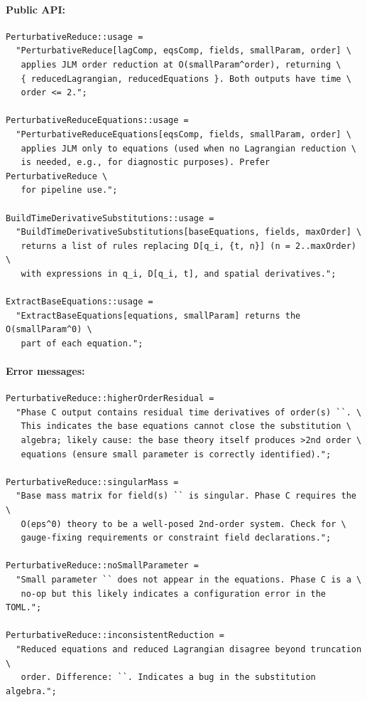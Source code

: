 \paragraph{Public API:}
\begin{verbatim}
PerturbativeReduce::usage =
  "PerturbativeReduce[lagComp, eqsComp, fields, smallParam, order] \
   applies JLM order reduction at O(smallParam^order), returning \
   { reducedLagrangian, reducedEquations }. Both outputs have time \
   order <= 2.";

PerturbativeReduceEquations::usage =
  "PerturbativeReduceEquations[eqsComp, fields, smallParam, order] \
   applies JLM only to equations (used when no Lagrangian reduction \
   is needed, e.g., for diagnostic purposes). Prefer PerturbativeReduce \
   for pipeline use.";

BuildTimeDerivativeSubstitutions::usage =
  "BuildTimeDerivativeSubstitutions[baseEquations, fields, maxOrder] \
   returns a list of rules replacing D[q_i, {t, n}] (n = 2..maxOrder) \
   with expressions in q_i, D[q_i, t], and spatial derivatives.";

ExtractBaseEquations::usage =
  "ExtractBaseEquations[equations, smallParam] returns the O(smallParam^0) \
   part of each equation.";
\end{verbatim}

\paragraph{Error messages:}
\begin{verbatim}
PerturbativeReduce::higherOrderResidual =
  "Phase C output contains residual time derivatives of order(s) ``. \
   This indicates the base equations cannot close the substitution \
   algebra; likely cause: the base theory itself produces >2nd order \
   equations (ensure small parameter is correctly identified).";

PerturbativeReduce::singularMass =
  "Base mass matrix for field(s) `` is singular. Phase C requires the \
   O(eps^0) theory to be a well-posed 2nd-order system. Check for \
   gauge-fixing requirements or constraint field declarations.";

PerturbativeReduce::noSmallParameter =
  "Small parameter `` does not appear in the equations. Phase C is a \
   no-op but this likely indicates a configuration error in the TOML.";

PerturbativeReduce::inconsistentReduction =
  "Reduced equations and reduced Lagrangian disagree beyond truncation \
   order. Difference: ``. Indicates a bug in the substitution algebra.";
\end{verbatim}

